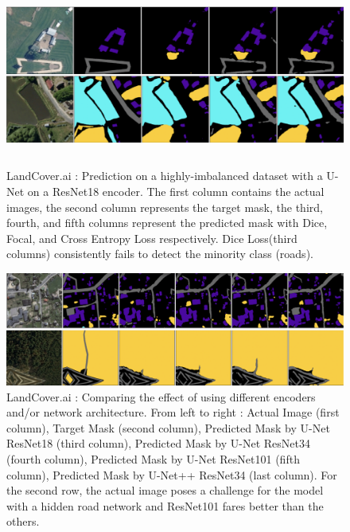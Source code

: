 \documentclass[conference]{IEEEtran}
\begin{document}
\begin{figure}
    \centering
    \includegraphics[height=6cm]{images/no-roads-losses/no-roads-smaller.png}
    \caption{LandCover.ai : Prediction on a highly-imbalanced dataset with a U-Net on a ResNet18 encoder. The first column contains the actual images, the second column represents the target mask, the third, fourth, and fifth columns represent the predicted mask with Dice, Focal, and Cross Entropy Loss respectively. Dice Loss(third columns) consistently fails to detect the minority class (roads).}
\end{figure}

\begin{figure}
    \centering
    \includegraphics[width=\textwidth]{images/encoders/encoders-vis.png}
    \caption{LandCover.ai : Comparing the effect of using different encoders and/or network architecture. From left to right : Actual Image (first column), Target Mask (second column), Predicted Mask by U-Net ResNet18 (third column), Predicted Mask by U-Net ResNet34 (fourth column), Predicted Mask by U-Net ResNet101 (fifth column), Predicted Mask by U-Net++ ResNet34 (last column). For the second row, the actual image poses a challenge for the model with a hidden road network and ResNet101 fares better than the others.}
\end{figure}
\clearpage

\printbibliography %
\end{document}
